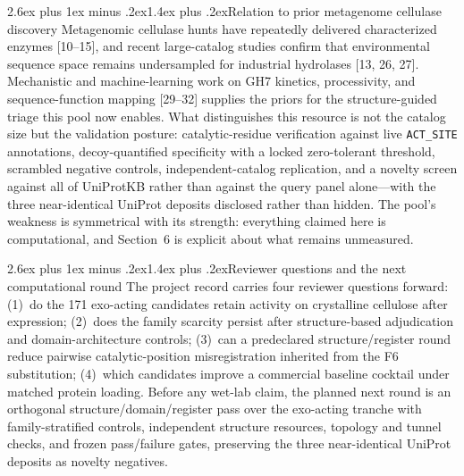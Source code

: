 \documentclass[11pt]{article}
\makeatletter
\renewcommand{\subsection}{\@startsection{subsection}{2}{\z@}%
  {2.6ex plus 1ex minus .2ex}{1.4ex plus .2ex}{\large\bfseries\color{navy}}}
\makeatother
\begin{document}
\subsection{Relation to prior metagenome cellulase discovery}
Metagenomic cellulase hunts have repeatedly delivered characterized enzymes [10--15], and recent large-catalog studies confirm that environmental sequence space remains undersampled for industrial hydrolases [13, 26, 27]. Mechanistic and machine-learning work on GH7 kinetics, processivity, and sequence-function mapping [29--32] supplies the priors for the structure-guided triage this pool now enables. What distinguishes this resource is not the catalog size but the validation posture: catalytic-residue verification against live \texttt{ACT\_SITE} annotations, decoy-quantified specificity with a locked zero-tolerant threshold, scrambled negative controls, independent-catalog replication, and a novelty screen against all of UniProtKB rather than against the query panel alone---with the three near-identical UniProt deposits disclosed rather than hidden. The pool's weakness is symmetrical with its strength: everything claimed here is computational, and Section~6 is explicit about what remains unmeasured.

\subsection{Reviewer questions and the next computational round}
The project record carries four reviewer questions forward: (1)~do the 171 exo-acting candidates retain activity on crystalline cellulose after expression; (2)~does the family scarcity persist after structure-based adjudication and domain-architecture controls; (3)~can a predeclared structure/register round reduce pairwise catalytic-position misregistration inherited from the F6 substitution; (4)~which candidates improve a commercial baseline cocktail under matched protein loading. Before any wet-lab claim, the planned next round is an orthogonal structure/domain/register pass over the exo-acting tranche with family-stratified controls, independent structure resources, topology and tunnel checks, and frozen pass/failure gates, preserving the three near-identical UniProt deposits as novelty negatives.

\end{document}
